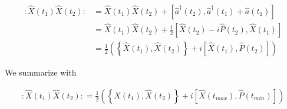 \documentclass[12pt]{article}
\newcommand{\ahat}{\hat{a}}
\newcommand{\adag}{\ahat^{\dag}}
\begin{document}
\begin{align}
:\hat{X}(t_1)\hat{X}(t_2): &= \hat{X}(t_1)\hat{X}(t_2) + \left[\adag(t_2),\adag(t_1) + \ahat(t_1)\right]\\
&= \hat{X}(t_1)\hat{X}(t_2) + \frac{1}{2} \left[\hat{X}(t_2)-i\hat{P}(t_2),\hat{X}(t_1)\right]\\
&= \frac{1}{2}\left(\left\{\hat{X}(t_1),\hat{X}(t_2)\right\} + i \left[\hat{X}(t_1),\hat{P}(t_2)\right]\right)
\end{align}

We summarize with

\begin{align}
:\hat{X}(t_1)\hat{X}(t_2): = \frac{1}{2}\left(\left\{\hat{X}(t_1),\hat{X}(t_2)\right\} + i \left[\hat{X}(t_{max}),\hat{P}(t_{min})\right]\right)
\end{align}


\pagebreak
\end{document}
